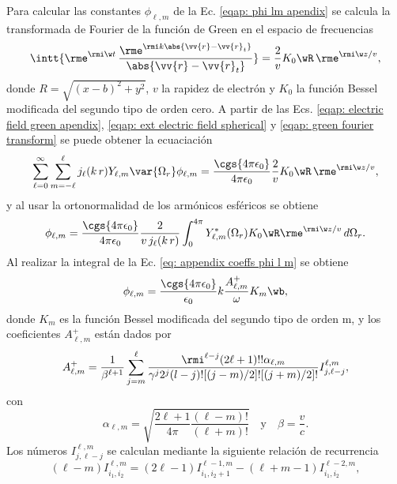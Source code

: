 Para calcular las constantes $\phi_{\ell, m}$ de la Ec. \eqref{eqap: phi lm apendix} se calcula la transformada de Fourier de la función de Green en el espacio de frecuencias \cite{maciel2019electromagnetic}
\begin{equation}
\intt{\rme^{\rmi \w t} \,\frac{\rme^{\rmi k \abs{\vv{r}-\vv{r}_t}}}{\abs{\vv{r}-\vv{r}_t}}} = \frac{2}{v} K_0\wR \, \rme^{\rmi \w z/v},
\label{eqap: green fourier transform}
\end{equation}
donde $R = \sqrt{(x-b)^2+y^2}$, $v$ la rapidez de electrón y $K_0$ la función Bessel modificada del segundo tipo de orden cero. A partir de las Ecs. \eqref{eqap: electric field green apendix}, \eqref{eqap: ext electric field spherical} y \eqref{eqap: green fourier transform} se puede obtener la ecuaciación
\begin{equation}
\sum_{\ell=0}^{\infty}\sum_{m=-\ell}^{\ell} j_{\ell}(k \, r) Y_{\ell,m}\var{\Omega_r} \phi_{\ell, m} = \frac{\cgs{4\pi\epsilon_0}}{4\pi\epsilon_0}\frac{2}{v} K_0\wR \, \rme^{\rmi \w z/v},
\end{equation}
y al usar la ortonormalidad de los armónicos esféricos se obtiene
\begin{equation}
\phi_{\ell,m} = \frac{\cgs{4\pi\epsilon_0}}{4\pi\epsilon_0}\frac{2}{v \,j_{\ell}(k\,r)} \int_{0}^{4\pi} Y_{\ell,m}^{*}(\Omega_r) K_0\wR \rme^{\rmi \w z /v} \, d\Omega_{r}.
\label{eq: appendix coeffs phi l m}
\end{equation}
Al realizar la integral de la Ec.  \eqref{eq: appendix coeffs phi l m} se obtiene \cite{de1999relativistic}
\begin{equation}
\phi_{\ell,m} = \frac{\cgs{4\pi\epsilon_0}}{\epsilon_0} k \frac{A_{\ell, m}^{+}}{\omega}K_m\wb,
\label{eq: phi lm GdA AlmKm}
\end{equation}
donde $K_m$ es la función Bessel modificada del segundo tipo de orden m, y los coeficientes $A_{\ell, m}^{+}$ están dados por
\begin{equation}
A_{\ell, m}^{+} = \frac{1}{\beta^{\ell +1}}\sum_{j=m}^{\ell}\frac{\rmi^{\ell - j} (2\ell + 1)!! \alpha_{\ell, m}}{\gamma^j 2^j (l-j)! [(j-m)/2]! [(j+m)/2]! } I_{j, \ell - j}^{\ell, m},
\end{equation}
con
\begin{equation}
\alpha_{\ell, m} = \sqrt{\frac{2\ell + 1}{4\pi}\frac{(\ell-m)!}{(\ell +m)!}} \quad \text{y} \quad \beta = \frac{v}{c}.
\end{equation}
Los números $I_{j, \ell - j}^{\ell, m}$ se calculan mediante la siguiente relación de recurrencia
\begin{equation}
(\ell - m) I_{i_1,i_2}^{\ell,m}=(2\ell-1)I_{i_1,i_2+1}^{\ell-1,m}-(\ell + m -1)I_{i_1,i_2}^{\ell-2,m},
\end{equation}
